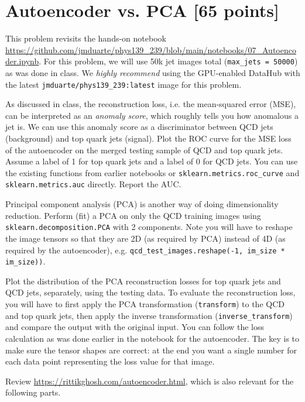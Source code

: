 \newpage
\section{Autoencoder vs. PCA [65 points]}

This problem revisits the hands-on notebook \url{https://github.com/jmduarte/phys139_239/blob/main/notebooks/07_Autoencoder.ipynb}.
For this problem, we will use 50k jet images total (\texttt{max_jets = 50000}) as was done in class.
We \emph{highly recommend} using the GPU-enabled DataHub with the latest \texttt{jmduarte/phys139_239:latest} image for this problem.

\begin{problem}[15]
As discussed in class, the reconstruction loss, i.e. the mean-squared error (MSE), can be interpreted as an \emph{anomaly score}, which roughly tells you how anomalous a jet is.
We can use this anomaly score as a discriminator between QCD jets (background) and top quark jets (signal).
Plot the ROC curve for the MSE loss of the autoencoder on the merged testing sample of QCD and top quark jets.
Assume a label of 1 for top quark jets and a label of 0 for QCD jets.
You can use the existing functions from earlier notebooks or \texttt{sklearn.metrics.roc_curve} and \texttt{sklearn.metrics.auc} directly.
Report the AUC.
\end{problem}


\begin{problem}[25]
Principal component analysis (PCA) is another way of doing dimensionality reduction.
Perform (fit) a PCA on only the QCD training images using \texttt{sklearn.decomposition.PCA} with 2 components.
Note you will have to reshape the image tensors so that they are 2D (as required by PCA) instead of 4D (as required by the autoencoder), e.g. \texttt{qcd_test_images.reshape(-1, im_size * im_size))}.

Plot the distribution of the PCA reconstruction losses for top quark jets and QCD jets, separately, using the testing data.
To evaluate the reconstruction loss, you will have to first apply the PCA transformation (\texttt{transform}) to the QCD and top quark jets, then apply the inverse transformation (\texttt{inverse_transform}) and compare the output with the original input.
You can follow the loss calculation as was done earlier in the notebook for the autoencoder.
The key is to make sure the tensor shapes are correct: at the end you want a single number for each data point representing the loss value for that image.

\begin{hint}
	Review \url{https://rittikghosh.com/autoencoder.html}, which is also relevant for the following parts.
\end{hint}
\end{problem}

